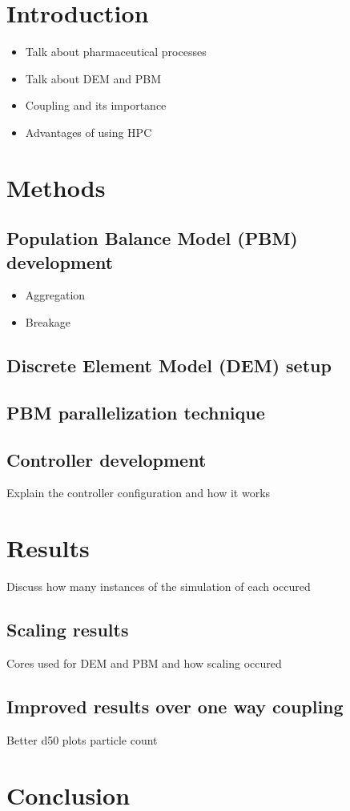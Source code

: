 \documentclass[fleqn,twoside,10pt]{article}
\begin{document}

\section{Introduction}
\begin{itemize}

\item Talk about pharmaceutical processes
\item Talk about DEM and PBM
\item Coupling and its importance
\item Advantages of using HPC
\end{itemize}

\section{Methods}
\subsection{Population Balance Model (PBM) development}
\begin{itemize}
\item Aggregation
\item Breakage
\end{itemize}
\subsection{Discrete Element Model (DEM) setup}
\subsection{PBM parallelization technique}
\subsection{Controller development}
Explain the controller configuration and how it works
\section{Results}
Discuss how many instances of the simulation of each occured
\subsection{Scaling results}
Cores used for DEM and PBM and how scaling occured
\subsection{Improved results over one way coupling}
Better d50 plots particle count
\section{Conclusion}



\end{document}
